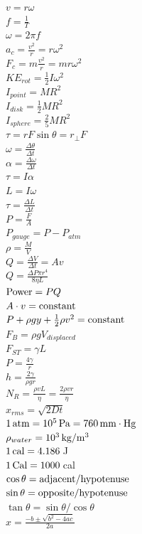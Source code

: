 \documentclass[letterpaper,addpoints,answers]{exam}
\begin{document}
\begin{multicols}{2}
 $v = r \omega$ \\
 $f = \frac{1}{T}$ \\
 $\omega = 2 \pi f$ \\
 $a_c = \frac{v^2}{r} = r \omega^2$ \\
 $F_c = m\frac{v^2}{r} = m r \omega^2$ \\
 $KE_{rot} = \frac{1}{2} I \omega^2$ \\
 $I_{point} = M R^2$ \\
 $I_{disk} = \frac{1}{2} M R^2$ \\
 $I_{sphere} = \frac{2}{5} M R^2$ \\
 $\tau = r F \sin\theta = r_\perp F$ \\
 $\omega = \frac{\Delta \theta}{\Delta t}$ \\
 $\alpha = \frac{\Delta \omega}{\Delta t}$ \\
 $\tau = I \alpha$ \\
 $L = I \omega$ \\
 $\tau = \frac{\Delta L}{\Delta t}$ \\
 $P = \frac{F}{A}$ \\
 $P_{gauge} = P - P_{atm}$ \\
 $\rho = \frac{M}{V}$ \\
 $Q = \frac{\Delta V}{\Delta t} = A v$ \\
 $Q = \frac{\Delta P \pi r^4}{8 \eta L}$ \\
 $\hbox{Power} = P Q$ \\
 $A \cdot v = \hbox{constant}$ \\
 $P + \rho g y + \frac{1}{2} \rho v^2 = \hbox{constant}$ \\
 $F_B = \rho g V_{displaced}$ \\
 $F_{ST} = \gamma L$ \\
 $P = \frac{4 \gamma}{r}$ \\
 $h = \frac{2 \gamma}{\rho g r}$ \\
 $N_R = \frac{\rho v L}{\eta} = \frac{2 \rho v r}{\eta}$ \\
 $x_{rms} = \sqrt{2 D t}$ \\
 $1\,\hbox{atm} = 10^5\,\hbox{Pa} = 760\,\hbox{mm}\cdot\hbox{Hg}$ \\
 $\rho_{water} = 10^3\,\hbox{kg}/\hbox{m}^3$ \\
 $1\,\hbox{cal} = 4.186$\,J \\ 
 $1\,\hbox{Cal} = 1000$\,cal \\ 
 $\cos\theta = \hbox{adjacent}/\hbox{hypotenuse}$ \\
 $\sin\theta = \hbox{opposite}/\hbox{hypotenuse}$ \\
 $\tan\theta = \sin\theta / \cos\theta$ \\
 $x = \frac{-b \pm \sqrt{b^2 - 4 a c}}{2 a}$ \\

 \end{multicols}
\end{document}
